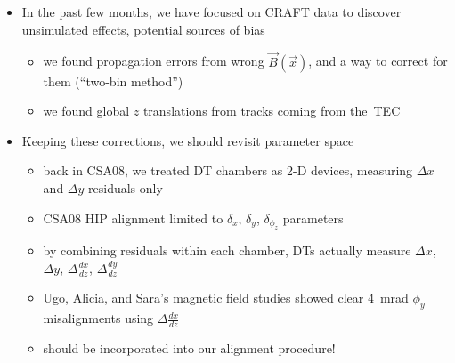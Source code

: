 \documentclass[compress]{beamer}
\begin{document}
\begin{frame}
\frametitle{\mbox{ }}

\begin{itemize}\setlength{\itemsep}{0.2 cm}
\item In the past few months, we have focused on CRAFT data to
  discover unsimulated effects, potential sources of bias
\begin{itemize}\setlength{\itemsep}{0.1 cm}
\item we found propagation errors from wrong $\vec{B}(\vec{x})$, and a
  way to correct for them (``two-bin method'')
\item we found global $z$ translations from tracks coming from \mbox{the TEC\hspace{-1 cm}}
\end{itemize}

\item Keeping these corrections, we should revisit parameter space
\begin{itemize}\setlength{\itemsep}{0.1 cm}
\item back in CSA08, we treated DT chambers as 2-D devices, measuring
  $\Delta x$ and $\Delta y$ residuals only
\item CSA08 HIP alignment limited to $\delta_x$, $\delta_y$, $\delta_{\phi_z}$ parameters
\item by combining residuals within each chamber, DTs actually measure
  $\Delta x$, $\Delta y$, $\Delta \frac{dx}{dz}$, $\Delta
  \frac{dy}{dz}$
\item Ugo, Alicia, and Sara's magnetic field studies showed clear
  4~mrad $\phi_y$ misalignments using $\Delta \frac{dx}{dz}$
\item should be incorporated into our alignment procedure!
\end{itemize}
\end{itemize}
\end{frame}
\end{document}
